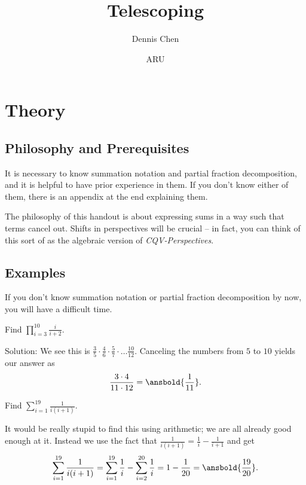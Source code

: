 \documentclass[mast]{lucky}
\title{Telescoping}
\author{Dennis Chen}
\date{ARU}
\begin{document}
\maketitle

\section{Theory}

\subsection{Philosophy and Prerequisites}

It is necessary to know summation notation and partial fraction decomposition, and it is helpful to have prior experience in them. If you don't know either of them, there is an appendix at the end explaining them.

The philosophy of this handout is about expressing sums in a way such that terms cancel out. Shifts in perspectives will be crucial -- in fact, you can think of this sort of as the algebraic version of \emph{CQV-Perspectives}.

\subsection{Examples}
If you don't know summation notation or partial fraction decomposition by now, you will have a difficult time.

\begin{exam}
Find $\prod\limits_{i=3}^{10}\frac{i}{i+2}.$
\end{exam}

\begin{sol}
Solution: We see this is $\frac{3}{5}\cdot \frac{4}{6}\cdot \frac{5}{7}\cdot \dots \frac{10}{12}.$ Canceling the numbers from $5$ to $10$ yields our answer as \[\frac{3\cdot 4}{11\cdot 12}=\ansbold{\frac{1}{11}}.\]
\end{sol}

\begin{exam}
Find $\sum\limits_{i=1}^{19} \frac{1}{i(i+1)}.$
\end{exam}

\begin{sol}
It would be really stupid to find this using arithmetic; we are all already good enough at it. Instead we use the fact that $\frac{1}{i(i+1)}=\frac{1}{i}-\frac{1}{i+1}$ and get \[\sum\limits_{i=1}^{19} \frac{1}{i(i+1)}=\sum\limits_{i=1}^{19} \frac{1}{i}-\sum\limits_{i=2}^{20}\frac{1}{i}=1-\frac{1}{20}=\ansbold{\frac{19}{20}}.\]
\end{sol}
\end{document}
